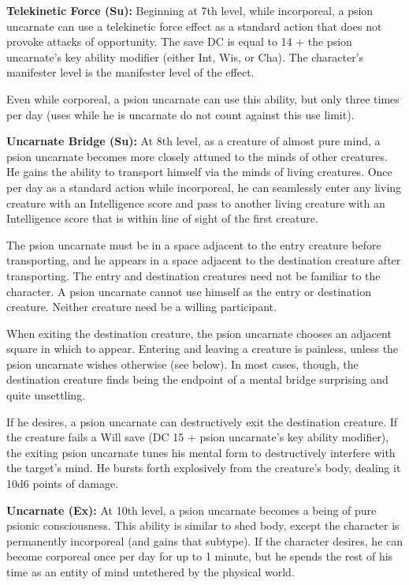 {\textbf{Telekinetic Force (Su):} Beginning at 7th level, while incorporeal, a psion uncarnate can use a telekinetic force effect as a standard action that does not provoke attacks of opportunity. The save DC is equal to 14 + the psion uncarnate's key ability modifier (either Int, Wis, or Cha). The character's manifester level is the manifester level of the effect.

Even while corporeal, a psion uncarnate can use this ability, but only three times per day (uses while he is uncarnate do not count against this use limit).

\textbf{Uncarnate Bridge (Su):} At 8th level, as a creature of almost pure mind, a psion uncarnate becomes more closely attuned to the minds of other creatures. He gains the ability to transport himself via the minds of living creatures. Once per day as a standard action while incorporeal, he can seamlessly enter any living creature with an Intelligence score and pass to another living creature with an Intelligence score that is within line of sight of the first creature.

The psion uncarnate must be in a space adjacent to the entry creature before transporting, and he appears in a space adjacent to the destination creature after transporting. The entry and destination creatures need not be familiar to the character. A psion uncarnate cannot use himself as the entry or destination creature. Neither creature need be a willing participant.

When exiting the destination creature, the psion uncarnate chooses an adjacent square in which to appear. Entering and leaving a creature is painless, unless the psion uncarnate wishes otherwise (see below). In most cases, though, the destination creature finds being the endpoint of a mental bridge surprising and quite unsettling.

If he desires, a psion uncarnate can destructively exit the destination creature. If the creature fails a Will save (DC 15 + psion uncarnate's key ability modifier), the exiting psion uncarnate tunes his mental form to destructively interfere with the target's mind. He bursts forth explosively from the creature's body, dealing it 10d6 points of damage.

\textbf{Uncarnate (Ex):} At 10th level, a psion uncarnate becomes a being of pure psionic consciousness. This ability is similar to shed body, except the character is permanently incorporeal (and gains that subtype). If the character desires, he can become corporeal once per day for up to 1 minute, but he spends the rest of his time as an entity of mind untethered by the physical world.
}